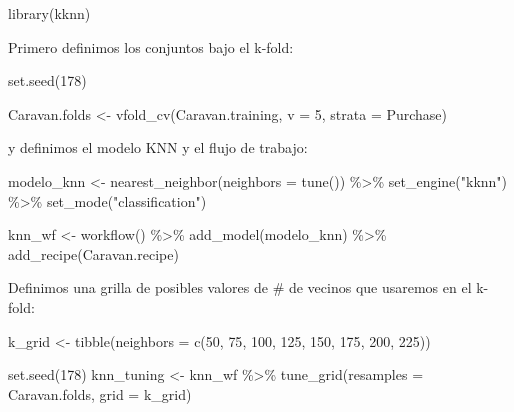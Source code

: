 \documentclass[
  12pt,
]{book}
\newenvironment{Shaded}{\begin{snugshade}}{\end{snugshade}}
\newcommand{\AttributeTok}[1]{\textcolor[rgb]{0.77,0.63,0.00}{#1}}
\newcommand{\DecValTok}[1]{\textcolor[rgb]{0.00,0.00,0.81}{#1}}
\newcommand{\FunctionTok}[1]{\textcolor[rgb]{0.00,0.00,0.00}{#1}}
\newcommand{\NormalTok}[1]{#1}
\newcommand{\OtherTok}[1]{\textcolor[rgb]{0.56,0.35,0.01}{#1}}
\newcommand{\SpecialCharTok}[1]{\textcolor[rgb]{0.00,0.00,0.00}{#1}}
\newcommand{\StringTok}[1]{\textcolor[rgb]{0.31,0.60,0.02}{#1}}
\theoremstyle{definition}
\theoremstyle{definition}
\theoremstyle{definition}
\theoremstyle{definition}
\theoremstyle{remark}
\begin{document}
\begin{Shaded}
\begin{Highlighting}[]
\FunctionTok{library}\NormalTok{(kknn)}
\end{Highlighting}
\end{Shaded}

Primero definimos los conjuntos bajo el k-fold:

\begin{Shaded}
\begin{Highlighting}[]
\FunctionTok{set.seed}\NormalTok{(}\DecValTok{178}\NormalTok{)}

\NormalTok{Caravan.folds }\OtherTok{\textless{}{-}} \FunctionTok{vfold\_cv}\NormalTok{(Caravan.training, }\AttributeTok{v =} \DecValTok{5}\NormalTok{,}
    \AttributeTok{strata =}\NormalTok{ Purchase)}
\end{Highlighting}
\end{Shaded}

y definimos el modelo KNN y el flujo de trabajo:

\begin{Shaded}
\begin{Highlighting}[]
\NormalTok{modelo\_knn }\OtherTok{\textless{}{-}} \FunctionTok{nearest\_neighbor}\NormalTok{(}\AttributeTok{neighbors =} \FunctionTok{tune}\NormalTok{()) }\SpecialCharTok{\%\textgreater{}\%}
    \FunctionTok{set\_engine}\NormalTok{(}\StringTok{"kknn"}\NormalTok{) }\SpecialCharTok{\%\textgreater{}\%}
    \FunctionTok{set\_mode}\NormalTok{(}\StringTok{"classification"}\NormalTok{)}

\NormalTok{knn\_wf }\OtherTok{\textless{}{-}} \FunctionTok{workflow}\NormalTok{() }\SpecialCharTok{\%\textgreater{}\%}
    \FunctionTok{add\_model}\NormalTok{(modelo\_knn) }\SpecialCharTok{\%\textgreater{}\%}
    \FunctionTok{add\_recipe}\NormalTok{(Caravan.recipe)}
\end{Highlighting}
\end{Shaded}

Definimos una grilla de posibles valores de \# de vecinos que usaremos en el k-fold:

\begin{Shaded}
\begin{Highlighting}[]
\NormalTok{k\_grid }\OtherTok{\textless{}{-}} \FunctionTok{tibble}\NormalTok{(}\AttributeTok{neighbors =} \FunctionTok{c}\NormalTok{(}\DecValTok{50}\NormalTok{, }\DecValTok{75}\NormalTok{, }\DecValTok{100}\NormalTok{, }\DecValTok{125}\NormalTok{, }\DecValTok{150}\NormalTok{,}
    \DecValTok{175}\NormalTok{, }\DecValTok{200}\NormalTok{, }\DecValTok{225}\NormalTok{))}

\FunctionTok{set.seed}\NormalTok{(}\DecValTok{178}\NormalTok{)}
\NormalTok{knn\_tuning }\OtherTok{\textless{}{-}}\NormalTok{ knn\_wf }\SpecialCharTok{\%\textgreater{}\%}
    \FunctionTok{tune\_grid}\NormalTok{(}\AttributeTok{resamples =}\NormalTok{ Caravan.folds, }\AttributeTok{grid =}\NormalTok{ k\_grid)}
\end{Highlighting}
\end{Shaded}
\end{document}
